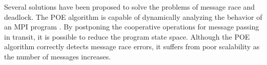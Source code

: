 %
%
% 


Several solutions have been proposed to solve the problems of message race and deadlock. The POE algorithm is capable of dynamically analyzing the behavior of an MPI program \cite{DBLP:conf/ppopp/VakkalankaSGK08}. By postponing the cooperative operations for message passing in transit, it is possible to reduce the program state space. Although the POE algorithm correctly detects message race errors, it suffers from poor scalability as the number of messages increases. 


